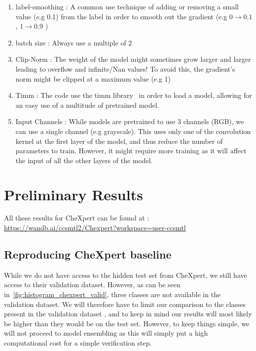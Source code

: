 \documentclass[11pt]{article}
\begin{document}
    \begin{enumerate}
        \item label-smoothing : A common use technique of adding or removing a small value (e.g 0.1) from the label in
        order to smooth out the gradient (e.g $0\xrightarrow{}0.1$ , $1\xrightarrow{}0.9$ )

        \item batch size : Always use a multiple of 2

        \item Clip-Norm : The weight of the model might sometimes grow larger and larger leading to overflow and
        infinite/Nan values! To avoid this, the gradient's norm might be clipped at a maximum value (e.g 1)

        \item Timm : The code use the timm library~\cite{timm} in order to load a model, allowing
        for an easy use of a multitude of pretrained model.


        \item Input Channels : While models are pretrained to use 3 channels (RGB), we can use a single channel (e.g grayscale). This uses
        only one of the convolution kernel at the first layer of the model, and thus reduce the number of parameters to train. However, it might require more training
        as it will affect the input of all the other layers of the model.

    \end{enumerate}

    \section{Preliminary Results}
        All these results for CheXpert can be found at : \url{https://wandb.ai/ccsmtl2/Chexpert?workspace=user-ccsmtl}
        \subsection{Reproducing CheXpert baseline}
            While we do not have access to the hidden test set from CheXpert, we still have access to their validation dataset. However,
            as can be seen in~\ref{fig:histogram_chexpert_valid}, three classes are not available in the validation dataset. We will therefore have to
            limit our comparison to the classes present in the validation dataset , and to keep in mind our results will
            most likely be higher than they would be on the test set. However, to keep things simple, we will not proceed to model ensembling as this
            will simply put a high computational cost for a simple verification step.
\end{document}
